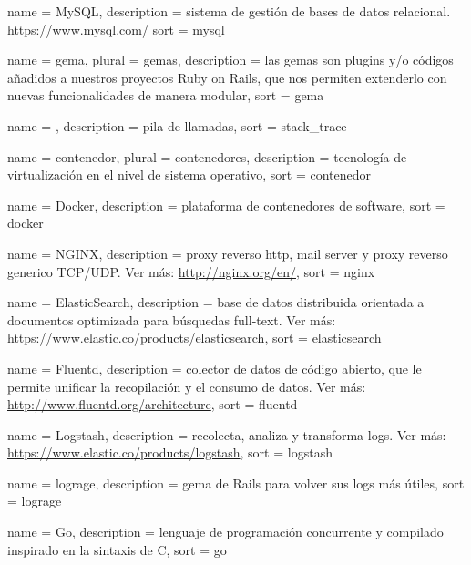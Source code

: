  {
  name        = {MySQL},
  description =
    {sistema de gestión de bases de datos relacional.
    \url{https://www.mysql.com/}}
  sort        = {mysql}
}

 {
  name        = {gema},
  plural      = {gemas},
  description =
    {las gemas son plugins y/o códigos añadidos a nuestros proyectos Ruby on
    Rails, que nos permiten extenderlo con nuevas funcionalidades de manera
    modular},
  sort        = {gema}
}

 {
  name        = {},
  description = {pila de llamadas},
  sort        = {stack_trace}
}

 {
  name        = {contenedor},
  plural      = {contenedores},
  description = {tecnología de virtualización en el nivel de sistema operativo},
  sort        = {contenedor}
}

 {
  name        = {Docker},
  description = {plataforma de contenedores de software},
  sort        = {docker}
}

 {
  name        = {NGINX},
  description =
    {proxy reverso http, mail server y proxy reverso generico TCP/UDP.
    Ver más: \url{http://nginx.org/en/}},
  sort        = {nginx}
}

 {
  name        = {ElasticSearch},
  description =
    {base de datos distribuida orientada a documentos optimizada para búsquedas
    full-text. Ver más: \url{https://www.elastic.co/products/elasticsearch}},
  sort        = {elasticsearch}
}

 {
  name        = {Fluentd},
  description =
    {colector de datos de código abierto, que le permite unificar
    la recopilación y el consumo de datos. Ver más:
    \url{http://www.fluentd.org/architecture}},
  sort        = {fluentd}
}

 {
  name        = {Logstash},
  description =
    {recolecta, analiza y transforma logs. Ver más:
    \url{https://www.elastic.co/products/logstash}},
  sort        = {logstash}
}

 {
  name        = {lograge},
  description = {gema de Rails para volver sus logs más útiles},
  sort        = {lograge}
}

 {
  name        = {Go},
  description =
    {lenguaje de programación concurrente y compilado inspirado en la sintaxis
    de C},
  sort        = {go}
}

